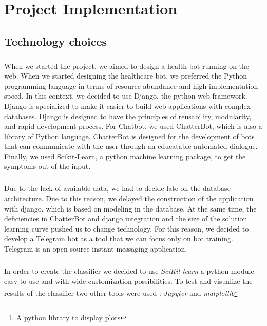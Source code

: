 \chapter{Project Implementation} 

\section{Technology choices}

\paragraph{}
When we	started	the	project,	we	aimed	to	design	a	health	bot	running	on	the	web.	When	we	started	designing	the	healthcare	bot,	we	preferred	the	Python	programming	language	in	 terms	of	resource	abundance	and	high	implementation	speed.	In	this	context,	we	decided	to	use	Django,	the	python	web	framework.	Django	is	specialized	to	make	it	easier	to	build	web	applications	with	complex	databases\cite{bib:misc:7}.	Django	is	designed	to	have	the	principles	of	reusability, modularity,	and	rapid	development	process.	For	Chatbot,	we	used	ChatterBot,	which	is	also	a	library	of	Python	language.	ChatterBot	is	designed	for	the	development	of	bots	that	can	communicate	with	the	user	through	an	educatable	automated	dialogue\cite{bib:misc:8}.	Finally,	we	used	Scikit-Learn,	a	python	machine	learning	package,	to	get	the	symptoms	out	of	the	input.	
\paragraph{}
Due	to	the	lack	of	available	data,	we	had	to	decide	late	on	the	database	architecture.	Due	to	this	reason,	we	delayed	the	construction	of	the	application	with	django,	which	is	based	on	modeling	in	the	database.	At	the	same	time,	the	deficiencies	in	ChatterBot	and	django	integration	and	the	size	of	the	solution	learning	curve	pushed	us	to	change	technology.	For	this	reason,	we	decided	to	develop	a	Telegram	bot	as	a	tool	that	we	can	focus	only	on	bot	training\cite{bib:misc:9}.	Telegram	is	an	open	source	instant	messaging	application.	

\paragraph{}
In order to create the classifier we decided to use \textit{SciKit-learn}\cite{bib:misc:2} a python module easy to use and with wide customization possibilities. To test and visualize the results of the classifier two other tools were used : \textit{Jupyter}\cite{bib:misc:3} and \textit{matplotlib}\footnote{A python library to display plots}

